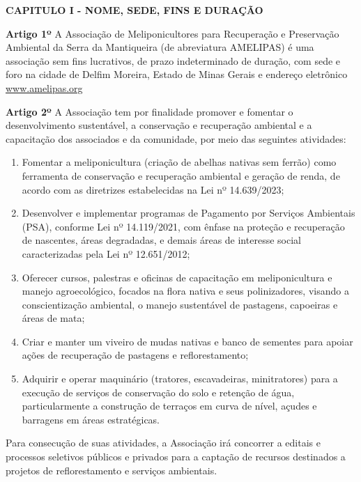\documentclass[12pt]{article}
\newcommand{\capitulo}[1]{\vspace{1.0em}\begin{center}\fontseries{b}\selectfont\textbf{\MakeUppercase{#1}}\end{center}}
\newcommand{\artigo}[1]{\vspace{1.0em}\noindent\textbf{#1}\hspace{0.75em}}
\newcommand{\paragrafo}[1]{\vspace{1.0em}\noindent{#1}\hspace{0.75em}}
\newcommand{\titulo}[1]{\begin{center}\fontsize{18}{22}\fontseries{b}\selectfont{#1\\[1.0em]}\end{center}}
\newcommand{\subtitulo}[1]{\begin{center}\fontsize{16}{17}\fontseries{m}\selectfont{#1\\[0.5em]}\end{center}}
\newcommand{\subsubtitulo}[1]{\begin{center}\fontsize{10}{12}\fontseries{m}\selectfont{#1\\[2.0em]}\end{center}}
\begin{document}
\titulo{ESTATUTO SOCIAL}
\subtitulo{Associação de Meliponicultores para Recuperação \\e Preservação Ambiental da Serra da Mantiqueira}\subsubtitulo{CNPJ 12.3456.789/0001-00}


\capitulo{Capitulo I - Nome, Sede, Fins e Duração}

\artigo{Artigo 1º} A Associação de Meliponicultores para Recuperação e Preservação Ambiental da Serra da Mantiqueira (de abreviatura AMELIPAS) é uma associação sem fins lucrativos, de prazo indeterminado de duração, com sede e foro na cidade de Delfim Moreira, Estado de Minas Gerais e endereço eletrônico \url{www.amelipas.org}

\artigo{Artigo 2º} A Associação tem por finalidade promover e fomentar o desenvolvimento sustentável, a conservação e recuperação ambiental e a capacitação dos associados e da comunidade, por meio das seguintes atividades:
\begin{enumerate}[label=\alph*)]
  \item Fomentar a meliponicultura (criação de abelhas nativas sem ferrão) como ferramenta de conservação e recuperação ambiental e geração de renda, de acordo com as diretrizes estabelecidas na Lei nº 14.639/2023;
  \item Desenvolver e implementar programas de Pagamento por Serviços Ambientais (PSA), conforme Lei nº 14.119/2021, com ênfase na proteção e recuperação de nascentes, áreas degradadas, e demais áreas de interesse social caracterizadas pela Lei nº 12.651/2012;
  \item Oferecer cursos, palestras e oficinas de capacitação em meliponicultura e manejo agroecológico, focados na flora nativa e seus polinizadores, visando a conscientização ambiental, o manejo sustentável de pastagens, capoeiras e áreas de mata;
  \item Criar e manter um viveiro de mudas nativas e banco de sementes para apoiar ações de recuperação de pastagens e reflorestamento;
  \item Adquirir e operar maquinário (tratores, escavadeiras, minitratores) para a execução de serviços de conservação do solo e retenção de água, particularmente a construção de terraços em curva de nível, açudes e barragens em áreas estratégicas.
\end{enumerate}

\paragrafo{§ 1º} Para consecução de suas atividades, a Associação irá concorrer a editais e processos seletivos públicos e privados para a captação de recursos destinados a projetos de reflorestamento e serviços ambientais.
\end{document}
